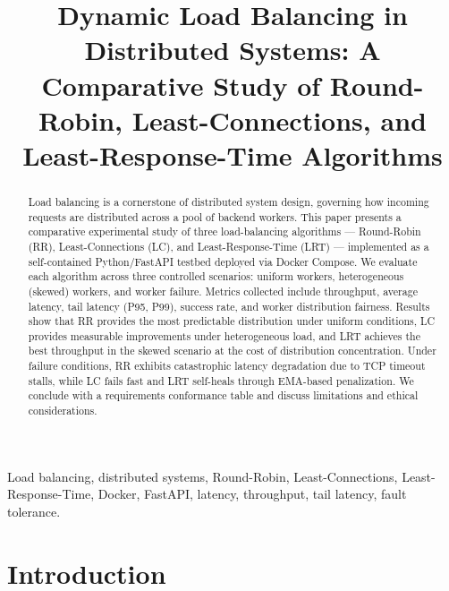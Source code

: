 \documentclass[conference]{IEEEtran}
\begin{document}
\title{Dynamic Load Balancing in Distributed Systems: A Comparative Study of Round-Robin, Least-Connections, and Least-Response-Time Algorithms}

\author{
  \and
  \and
}

\maketitle

\begin{abstract}
Load balancing is a cornerstone of distributed system design, governing how incoming requests are distributed across a pool of backend workers. This paper presents a comparative experimental study of three load-balancing algorithms --- Round-Robin (RR), Least-Connections (LC), and Least-Response-Time (LRT) --- implemented as a self-contained Python/FastAPI testbed deployed via Docker Compose. We evaluate each algorithm across three controlled scenarios: uniform workers, heterogeneous (skewed) workers, and worker failure. Metrics collected include throughput, average latency, tail latency (P95, P99), success rate, and worker distribution fairness. Results show that RR provides the most predictable distribution under uniform conditions, LC provides measurable improvements under heterogeneous load, and LRT achieves the best throughput in the skewed scenario at the cost of distribution concentration. Under failure conditions, RR exhibits catastrophic latency degradation due to TCP timeout stalls, while LC fails fast and LRT self-heals through EMA-based penalization. We conclude with a requirements conformance table and discuss limitations and ethical considerations.
\end{abstract}

\begin{IEEEkeywords}
Load balancing, distributed systems, Round-Robin, Least-Connections, Least-Response-Time, Docker, FastAPI, latency, throughput, tail latency, fault tolerance.
\end{IEEEkeywords}

\section{Introduction}
\end{document}

